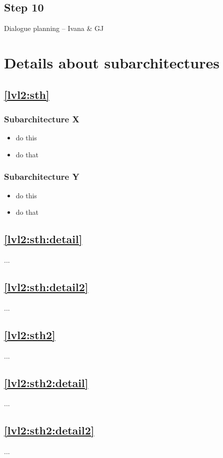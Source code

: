 \documentclass{article}
\begin{document}
\subsection{Step 10}
Dialogue planning -- Ivana \& GJ

\section{Details about subarchitectures}

\subsection{\ref{lvl2:sth}}
\subsubsection{Subarchitecture X}
\begin{itemize}
\item do this
\item do that
\end{itemize}

\subsubsection{Subarchitecture Y}
\begin{itemize}
\item do this
\item do that
\end{itemize}

\subsection{\ref{lvl2:sth:detail}}
...
\subsection{\ref{lvl2:sth:detail2}}
...
\subsection{\ref{lvl2:sth2}}
...
\subsection{\ref{lvl2:sth2:detail}}
...
\subsection{\ref{lvl2:sth2:detail2}}
...
\end{document}
